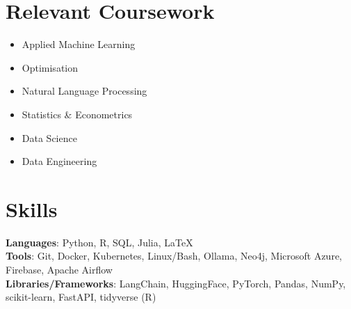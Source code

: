\documentclass[letterpaper,11pt]{article}
\makeatletter
\newcommand{\resumeItem}[1]{
  \item\small{
    {#1 \vspace{-2pt}}
  }
}
\newcommand{\resumeSubheading}[4]{
  \vspace{-2pt}\item
    \begin{tabular*}{1.0\textwidth}[t]{l@{\extracolsep{\fill}}r}
      \textbf{#1} & \small #2 \\
      \textit{\small#3} & \textit{\small #4} \\
    \end{tabular*}\vspace{-7pt}
}
\newcommand{\resumeSubHeadingListStart}{\begin{itemize}[leftmargin=0.0in, label={}]}
\newcommand{\resumeSubHeadingListEnd}{\end{itemize}}
\newcommand{\resumeItemListStart}{\begin{itemize}}
\newcommand{\resumeItemListEnd}{\end{itemize}\vspace{-5pt}}
\makeatother
\begin{document}

\section{Relevant Coursework}
        \begin{multicols}{3}
            \begin{itemize}[itemsep=-5pt, parsep=3pt]
                \item\small Applied Machine Learning  
                \item Optimisation
                \item Natural Language Processing
                \item Statistics \& Econometrics 
                \item Data Science
                \item Data Engineering
            \end{itemize}
        \end{multicols}

\section{Skills}
  \begin{itemize}[leftmargin=0.15in, label={}]
      \small{\item{
      \textbf{Languages}{: Python, R, SQL, Julia, \LaTeX} \\
      \textbf{Tools}{: Git, Docker, Kubernetes, Linux/Bash, Ollama, Neo4j, Microsoft Azure, Firebase, Apache Airflow} \\
      \textbf{Libraries/Frameworks}{: LangChain, HuggingFace, PyTorch, Pandas, NumPy, scikit-learn, FastAPI, tidyverse (R)}  \\
      }}
  \end{itemize} 

\end{document}
